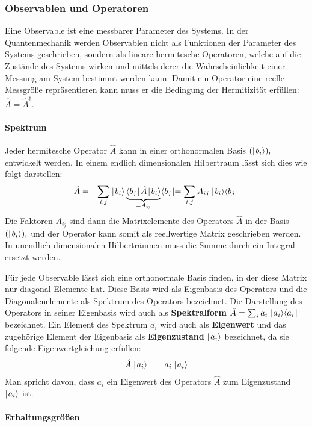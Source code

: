 \subsubsection{Observablen und Operatoren}

Eine Observable ist eine messbarer Parameter des Systems. In der Quantenmechanik werden Observablen nicht als Funktionen der Parameter des Systems geschrieben, sondern als lineare hermitesche Operatoren, welche auf die Zustände des Systems wirken und mittels derer die Wahrscheinlichkeit einer Messung am System bestimmt werden kann. Damit ein Operator eine reelle Messgröße repräsentieren kann muss er die Bedingung der Hermitizität erfüllen: $\hat{A}=\hat{A}^{\dagger}$. 

\paragraph{Spektrum}
Jeder hermitesche Operator $\hat{A}$ kann in einer orthonormalen Basis $(\mid\!\!\!\,\,{b_i}\rangle)_i$ entwickelt werden. In einem endlich dimensionalen Hilbertraum lässt sich dies wie folgt darstellen: 
\begin{eqnarray*}
	\hat{A} &=& \sum_{i,j} \ket{b_i}\underbrace{\bracket{b_j}{\hat{A}}{b_i}}_{= A_{ij}}\bra{b_j} = \sum_{i,j} A_{ij} \ket{b_i}\bra{b_j}
\end{eqnarray*}
Die Faktoren $A_{ij}$ sind dann die Matrixelemente des Operators $\hat{A}$ in der Basis $(\mid\!\!\!\,\,{b_i}\rangle)_i$ und der Operator kann somit als reellwertige Matrix geschrieben werden. In unendlich dimensionalen Hilberträumen muss die Summe durch ein Integral ersetzt werden. 

Für jede Observable lässt sich eine orthonormale Basis finden, in der diese Matrix nur diagonal Elemente hat. Diese Basis wird als Eigenbasis des Operators und die Diagonalenelemente als Spektrum des Operators bezeichnet. Die Darstellung des Operators in seiner Eigenbasis wird auch als {\bf Spektralform} $\hat{A}=\sum_{i}a_i\mid\!\!\!\,\,{a_i}\rangle\langle{a_i}\!\!\!\,\,\mid$ bezeichnet. Ein Element des Spektrum $a_i$ wird auch als {\bf Eigenwert} und das zugehörige Element der Eigenbasis als {\bf Eigenzustand} $\mid\!\!\!\,\,{a_i}\rangle$ bezeichnet, da sie folgende Eigenwertgleichung erfüllen: 
\begin{eqnarray*}
	\hat{A}\mid\!\!\!\,\,{a_i}\rangle &=& a_i \mid\!\!\!\,\,{a_i}\rangle
\end{eqnarray*}
Man spricht davon, dass $a_i$ ein Eigenwert des Operators $\hat{A}$ zum Eigenzustand $\mid\!\!\!\,\,{a_i}\rangle$ ist. 


\paragraph{Erhaltungsgrößen}

